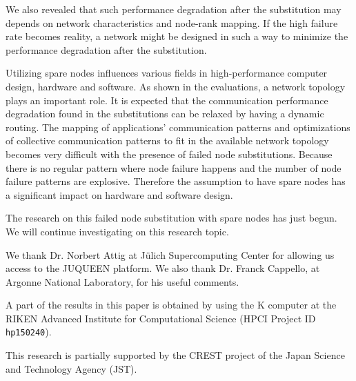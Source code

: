 \documentclass[Afour,times,sagev]{sagej}
\begin{document}
We also revealed that such performance degradation after the
substitution may depends on network characteristics and node-rank
mapping. If the high failure rate becomes reality, a network might be
designed in such a way to minimize the performance degradation after
the substitution.  

Utilizing spare nodes influences various fields in high-performance
computer design, hardware and software. As shown in the evaluations,
a network topology plays an important role. It is expected that the
communication performance degradation found in the substitutions can
be relaxed by having a dynamic routing. The mapping of applications'
communication patterns and optimizations of collective
communication patterns to fit in the available network topology becomes
very difficult with the presence of failed node substitutions. Because 
there is no regular pattern where node failure happens and the
number of node failure patterns are explosive. Therefore the
assumption to have spare nodes has a significant impact on hardware
and software design.

The research on this failed node substitution with spare nodes has
just begun. We will continue investigating on this research topic.

\begin{acks}
We thank Dr. Norbert Attig at J\"{u}lich Supercomputing Center for
allowing us access to the JUQUEEN platform. We also thank Dr. Franck
Cappello, at Argonne National Laboratory, for his useful
comments. 

A part of the results in this paper is obtained by using the K
computer at the RIKEN Advanced Institute for Computational
Science (HPCI Project ID {\tt hp150240}).
\end{acks}

\begin{funding}
This research is partially supported by the CREST project of
the Japan Science and Technology Agency (JST).
\end{funding}



\end{document}
